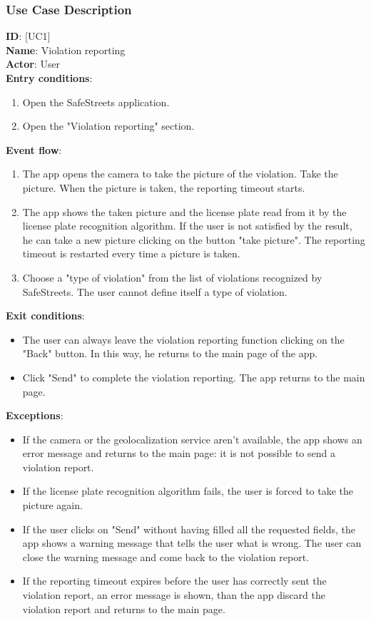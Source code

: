 \documentclass{article}
\newcommand\usecase[1]{ [UC#1] }
\begin{document}
			\clearpage
			\subsubsection{Use Case Description}
				
				\textbf{ID}: \usecase{1} \\
				\textbf{Name}:   Violation reporting\\
				\textbf{Actor}:  User\\
				\textbf{Entry conditions}:
				\begin{enumerate}
					\item Open the SafeStreets application.
					\item Open the "Violation reporting" section.
				\end{enumerate}
				\textbf{Event flow}:
				\begin{enumerate}
					\item The app opens the camera to take the picture of the violation. Take the picture. When the picture is taken, the reporting timeout starts.
					\item The app shows the taken picture and the license plate read from it by the license plate recognition algorithm. If the user is not satisfied by the result, he can take a new picture clicking on the button "take picture". The reporting timeout is restarted every time a picture is taken.
					\item Choose a "type of violation" from the list of violations recognized by SafeStreets. The user cannot define itself a type of violation.
				\end{enumerate}
				\textbf{Exit conditions}:
				\begin{itemize}
					\item The user can always leave the violation reporting function clicking on the "Back" button. In this way, he returns to the main page of the app.
					\item Click "Send" to complete the violation reporting. The app returns to the main page.
				\end{itemize}
				\textbf{Exceptions}:
				\begin{itemize}
					\item If the camera or the geolocalization service aren't available, the app shows an error message and returns to the main page: it is not possible to send a violation report.
					\item If the license plate recognition algorithm fails, the user is forced to take the picture again.
					\item If the user clicks on "Send" without having filled all the requested fields, the app shows a warning message that tells the user what is wrong. The user can close the warning message and come back to the violation report. 
					\item If the reporting timeout expires before the user has correctly sent the violation report, an error message is shown, than the app discard the violation report and returns to the main page.\\
				\end{itemize}
			
\end{document}
